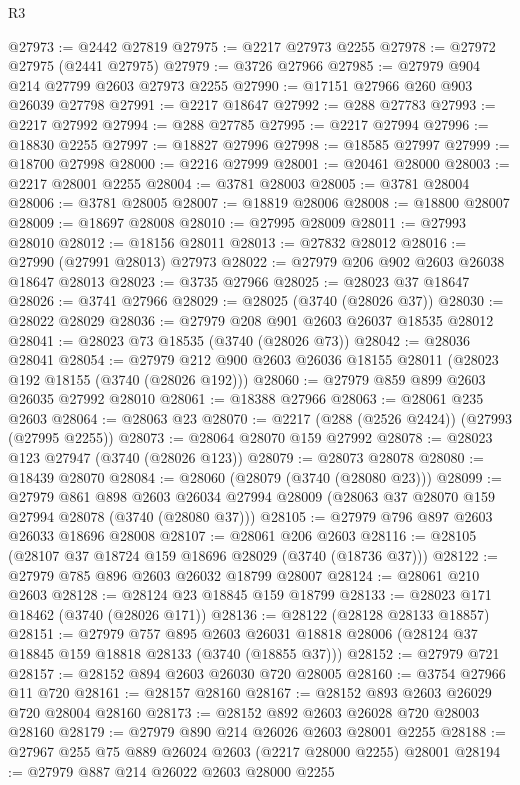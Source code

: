 \begin{lexlean}{R3}
\begin{coremodule}
@27973 := @2442 @27819
@27975 := @2217 @27973 @2255
@27978 := @27972 @27975 (@2441 @27975)
@27979 := @3726 @27966
@27985 := @27979 @904 @214 @27799 @2603 @27973 @2255
@27990 := @17151 @27966 @260 @903 @26039 @27798
@27991 := @2217 @18647
@27992 := @288 @27783
@27993 := @2217 @27992
@27994 := @288 @27785
@27995 := @2217 @27994
@27996 := @18830 @2255
@27997 := @18827 @27996
@27998 := @18585 @27997
@27999 := @18700 @27998
@28000 := @2216 @27999
@28001 := @20461 @28000
@28003 := @2217 @28001 @2255
@28004 := @3781 @28003
@28005 := @3781 @28004
@28006 := @3781 @28005
@28007 := @18819 @28006
@28008 := @18800 @28007
@28009 := @18697 @28008
@28010 := @27995 @28009
@28011 := @27993 @28010
@28012 := @18156 @28011
@28013 := @27832 @28012
@28016 := @27990 (@27991 @28013) @27973
@28022 := @27979 @206 @902 @2603 @26038 @18647 @28013
@28023 := @3735 @27966
@28025 := @28023 @37 @18647
@28026 := @3741 @27966
@28029 := @28025 (@3740 (@28026 @37))
@28030 := @28022 @28029
@28036 := @27979 @208 @901 @2603 @26037 @18535 @28012
@28041 := @28023 @73 @18535 (@3740 (@28026 @73))
@28042 := @28036 @28041
@28054 := @27979 @212 @900 @2603 @26036 @18155 @28011 (@28023 @192 @18155 (@3740 (@28026 @192)))
@28060 := @27979 @859 @899 @2603 @26035 @27992 @28010
@28061 := @18388 @27966
@28063 := @28061 @235 @2603
@28064 := @28063 @23
@28070 := @2217 (@288 (@2526 @2424)) (@27993 (@27995 @2255))
@28073 := @28064 @28070 @159 @27992
@28078 := @28023 @123 @27947 (@3740 (@28026 @123))
@28079 := @28073 @28078
@28080 := @18439 @28070
@28084 := @28060 (@28079 (@3740 (@28080 @23)))
@28099 := @27979
    @861
    @898
    @2603
    @26034
    @27994
    @28009
    (@28063 @37 @28070 @159 @27994 @28078 (@3740 (@28080 @37)))
@28105 := @27979 @796 @897 @2603 @26033 @18696 @28008
@28107 := @28061 @206 @2603
@28116 := @28105 (@28107 @37 @18724 @159 @18696 @28029 (@3740 (@18736 @37)))
@28122 := @27979 @785 @896 @2603 @26032 @18799 @28007
@28124 := @28061 @210 @2603
@28128 := @28124 @23 @18845 @159 @18799
@28133 := @28023 @171 @18462 (@3740 (@28026 @171))
@28136 := @28122 (@28128 @28133 @18857)
@28151 := @27979
    @757
    @895
    @2603
    @26031
    @18818
    @28006
    (@28124 @37 @18845 @159 @18818 @28133 (@3740 (@18855 @37)))
@28152 := @27979 @721
@28157 := @28152 @894 @2603 @26030 @720 @28005
@28160 := @3754 @27966 @11 @720
@28161 := @28157 @28160
@28167 := @28152 @893 @2603 @26029 @720 @28004 @28160
@28173 := @28152 @892 @2603 @26028 @720 @28003 @28160
@28179 := @27979 @890 @214 @26026 @2603 @28001 @2255
@28188 := @27967 @255 @75 @889 @26024 @2603 (@2217 @28000 @2255) @28001
@28194 := @27979 @887 @214 @26022 @2603 @28000 @2255

\end{coremodule}
\end{lexlean}
